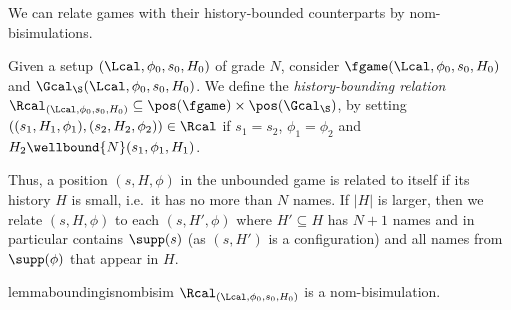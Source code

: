 We can relate games with their history-bounded counterparts by nom-bisimulations.


\begin{definition}\label{def:theFreshRelation}
Given a setup $(\Lcal,\phi_0,s_0,H_0)$ of grade $N$, consider $\fgame(\Lcal, \phi_0,s_0, H_0)$  and $\Gcal_\S(\Lcal, \phi_0, s_0, H_0)$.
We define the \emph{history-bounding relation} $\Rcal_{(\Lcal, \phi_0, s_0, H_0)} \subseteq \pos(\fgame) \times \pos(\Gcal_\S)$, by setting $((s_1, H_1, \phi_1), (s_2, H_2, \phi_2)) \in \Rcal$ if $s_1 = s_2$, $\phi_1 = \phi_2$ and $H_2\wellbound{N}(s_1,\phi_1,H_1)$.
\end{definition}

Thus, a position $(s,H,\phi)$ in the unbounded game is related to itself if its history $H$ is small, i.e.\ it has no more than $N$ names. If $|H|$ is larger, then we relate $(s,H,\phi)$ to each $(s,H',\phi)$ where $H'\subseteq H$ has $N+1$ names and in particular contains $\supp(s)$ (as $(s,H')$ is a configuration) and all names from $\supp(\phi)$ that appear in $H$. 



\begin{restatable}{lemma}{boundingisnombisim}\label{lem:boundingisnombisim}
$\Rcal_{(\Lcal, \phi_0, s_0, H_0)}$ is a nom-bisimulation.
\end{restatable}

